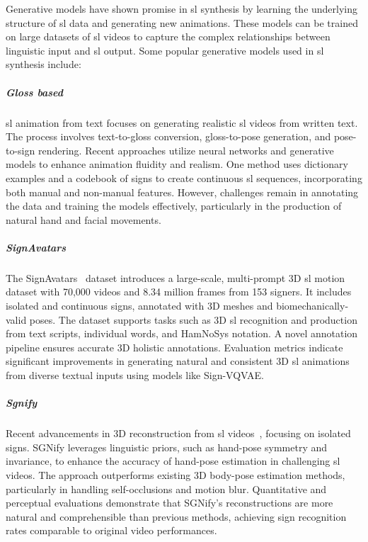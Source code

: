 \documentclass[../../main.tex]{subfiles}
\begin{document}
Generative models have shown promise in \gls{sl} synthesis by learning the underlying structure of \gls{sl} data and generating new animations. These models can be trained on large datasets of \gls{sl} videos to capture the complex relationships between linguistic input and \gls{sl} output. Some popular generative models used in \gls{sl} synthesis include:

\subparagraph{Gloss based}
\label{ch:background_work:sign_language_synthesis:3d_techniques:sign_language_synthesis_systems:synthesis_based_on_generative_models:gloss_based}

\gls{sl} animation from text focuses on generating realistic \gls{sl} videos from written text. The process involves text-to-gloss conversion, gloss-to-pose generation, and pose-to-sign rendering. Recent approaches utilize neural networks and generative models to enhance animation fluidity and realism. One method uses dictionary examples and a codebook of signs to create continuous \gls{sl} sequences, incorporating both manual and non-manual features. However, challenges remain in annotating the data and training the models effectively, particularly in the production of natural hand and facial movements.

\subparagraph{SignAvatars}
\label{ch:background_work:sign_language_synthesis:3d_techniques:sign_language_synthesis_systems:synthesis_based_on_generative_models:signavatars}

The SignAvatars~\cite{yu2023signavatars} dataset introduces a large-scale, multi-prompt 3D \gls{sl} motion dataset with 70,000 videos and 8.34 million frames from 153 signers. It includes isolated and continuous signs, annotated with 3D meshes and biomechanically-valid poses. The dataset supports tasks such as 3D \gls{sl} recognition and production from text scripts, individual words, and HamNoSys notation. A novel annotation pipeline ensures accurate 3D holistic annotations. Evaluation metrics indicate significant improvements in generating natural and consistent 3D \gls{sl} animations from diverse textual inputs using models like Sign-VQVAE.

\subparagraph{Sgnify}
\label{ch:background_work:sign_language_synthesis:3d_techniques:sign_language_synthesis_systems:synthesis_based_on_generative_models:sgnify}

Recent advancements in 3D reconstruction from \gls{sl} videos~\cite{Forte_2023_CVPR}, focusing on isolated signs. SGNify leverages linguistic priors, such as hand-pose symmetry and invariance, to enhance the accuracy of hand-pose estimation in challenging \gls{sl} videos. The approach outperforms existing 3D body-pose estimation methods, particularly in handling self-occlusions and motion blur. Quantitative and perceptual evaluations demonstrate that SGNify's reconstructions are more natural and comprehensible than previous methods, achieving sign recognition rates comparable to original video performances.
\end{document}
